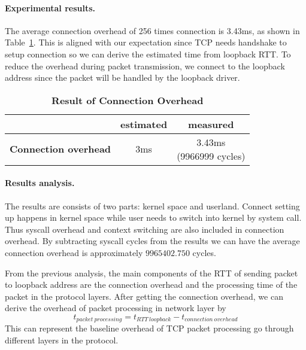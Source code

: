 \paragraph{Experimental results.} The average connection overhead of 256 times connection is 3.43ms, as shown in Table~\ref{table:connection-overhead}. This is aligned with our expectation since TCP needs handshake to setup connection so we can derive the estimated time from loopback RTT. To reduce the overhead during packet transmission, we connect to the loopback address since the packet will be handled by the loopback driver.
\begin{table}[h]
	\centering
	\begin{tabular}{c|c|c}
		\hline
		\makecell{Type} & estimated & measured\\ \hline
        \textbf{Connection overhead} & 3ms &  \makecell{3.43ms \\ (9966999 cycles)} \\ \hline
	\end{tabular}
	\caption{\textbf{Result of Connection Overhead}}
	\label{table:connection-overhead}
\end{table}

\paragraph{Results analysis.} The results are consists of two parts: kernel space and userland. Connect setting up happens in kernel space while user needs to switch into kernel by system call. Thus syscall overhead and context switching are also included in connection overhead. By subtracting syscall cycles from the results we can have the average connection overhead is approximately $9965402.750$ cycles.

From the previous analysis, the main components of the RTT of sending packet to loopback address are the connection overhead and the processing time of the packet in the protocol layers. After getting the connection overhead, we can derive the overhead of packet processing in network layer by
\begin{equation}
    t_{packet\ processing}=t_{RTT\ loopback}-t_{connection\ overhead}
\end{equation}
This can represent the baseline overhead of TCP packet processing go through different layers in the protocol.
